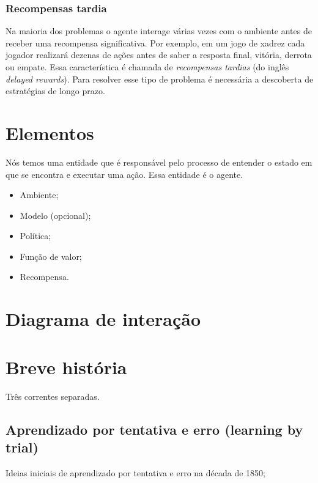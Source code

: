 \documentclass{article}
\begin{document}
            \subsubsection{Recompensas tardia}
        
                Na maioria dos problemas o agente interage várias vezes com o ambiente antes de receber uma recompensa significativa. Por exemplo, em um jogo de xadrez cada jogador realizará dezenas de ações antes de saber a resposta final, vitória, derrota ou empate. Essa característica é chamada de \emph{recompensas tardias} (do inglês \emph{delayed rewards}). Para resolver esse tipo de problema é necessária a descoberta de estratégias de longo prazo.
        
    \section{Elementos}
    
        Nós temos uma entidade que é responsável pelo processo de entender o estado em que se encontra e executar uma ação. Essa entidade é o agente. 
    
        \begin{itemize}
            \item Ambiente;
            \item Modelo (opcional);
            \item Política;
            \item Função de valor;
            \item Recompensa.
        \end{itemize}
        
    \section{Diagrama de interação}
    
        \begin{center}
            \rlinteraction
        \end{center}
    
    \section{Breve história}
    
        Três correntes separadas.
        
        \subsection{Aprendizado por tentativa e erro (learning by trial)}
            Ideias iniciais de aprendizado por tentativa e erro na década de 1850;
            
\end{document}
